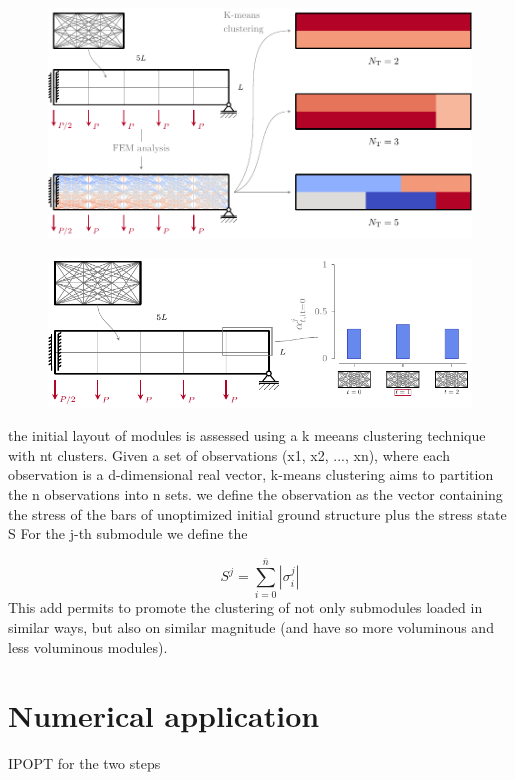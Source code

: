 \begin{figure}
    \centering
    \includegraphics{figures/06_DMO/00_stress_clustering/stress_clustering.pdf}
    \caption{}
    \label{fig:06}
\end{figure}

\begin{figure}
    \centering
    \includegraphics{figures/06_DMO/00_x0/x0.pdf}
    \caption{}
    \label{fig:06}
\end{figure}

the initial layout of modules is assessed using a k meeans clustering technique with nt clusters. Given a set of observations (x1, x2, ..., xn), where each observation is a d-dimensional real vector, k-means clustering aims to partition the n observations into n sets. we define the observation as the vector containing the stress of the bars of unoptimized initial ground structure plus the stress state S For the j-th submodule we define the 

\begin{equation}
    S^j=\sum_{i=0}^{\bar{n}}|\sigma^j_i|
\end{equation}
This add permits to promote the clustering of not only submodules loaded in similar ways, but also on similar magnitude (and have so more voluminous and less voluminous modules).

\section{Numerical application}
IPOPT for the two steps

